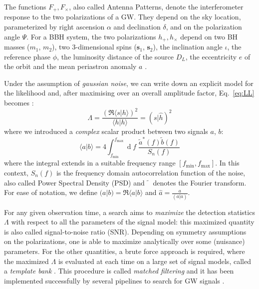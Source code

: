 \documentclass[twocolumn,showpacs,preprintnumbers,nofootinbib,prd,
superscriptaddress,10pt]{revtex4-2}
\renewcommand{\d}[1]{\ensuremath{\operatorname{d}\!{#1}}}
\newcommand{\scalar}[2]{\langle #1|#2 \rangle}
\newcommand{\rescalar}[2]{( #1 |#2 )}
\begin{document}
The functions $F_+, F_\times$, also called Antenna Patterns, denote the interferometer response to the two polarizations of a GW. They depend on the sky location, parameterized by right ascension $\alpha$ and declination $\delta$, and on the polarization angle $\Psi$. 
For a BBH system, the two polarizations $h_+, h_\times$ depend on two BH masses ($m_1$, $m_2$), two 3-dimensional spins ($\mathbf{s}_1$, $\mathbf{s}_2$), the inclination angle $\iota$, the reference phase $\phi$, the luminosity distance of the source $D_L$, the eccentricity $e$ of the orbit and the mean periastron anomaly $a$ \cite{Sathyaprakash_2009}.

Under the assumption of {\it gaussian noise}, we can write down an explicit model for the likelihood and, after maximising over an overall amplitude factor, Eq.~\eqref{eq:LL} becomes \cite{Creighton_book, Maggiore:2007ulw, Harry:2016ijz}:
\begin{equation}\label{eq:LL_gauss}
	\Lambda = \frac{\left(\Re\scalar{s}{h}\right)^2}{\scalar{h}{h}} = \rescalar{s}{\hat{h}}^2
\end{equation}
where we introduced a {\it complex} scalar product between two signals $a$, $b$:
\begin{equation} \label{eq:scalar_product}
	\scalar{a}{b} = 4 \int_{f_\text{min}}^{f_\text{max}} \!\!\!\! \d{f} \; \frac{\tilde{a}^*(f) \tilde{b}(f)}{S_n(f)}
\end{equation}
where the integral extends in a suitable frequency range $[f_\text{min}, f_\text{max}]$.
In this context, $S_n(f)$ is the frequency domain autocorrelation function of the noise, also called Power Spectral Density (PSD) and $\tilde{\phantom{a}}$ denotes the Fourier transform.
For ease of notation, we define ${\rescalar{a}{b} = \Re\scalar{a}{b}}$ and ${\hat{a} = \frac{a}{\rescalar{a}{a}}}$.

For any given observation time, a search aims to {\it maximize} the detection statistics $\Lambda$ with respect to all the parameters of the signal model: this maximized quantity is also called signal-to-noise ratio (SNR).
Depending on symmetry assumptions on the polarizations, one is able to maximize analytically over some (nuisance) parameters.
For the other quantities, a brute force approach is required, where the maximized $\Lambda$ is evaluated at each time on a large set of signal models, called a {\it template bank} \cite{PhysRevD.77.104017, Mukherjee:2018yra}.
This procedure is called {\it matched filtering} and it has been implemented successfully by several pipelines to search for GW signals \cite{Privitera:2013xza, Usman:2015kfa, Capano:2016dsf, PhysRevD.95.042001, gstlal_paper2, Aubin:2020goo, Chu:2020pjv}.
\end{document}
